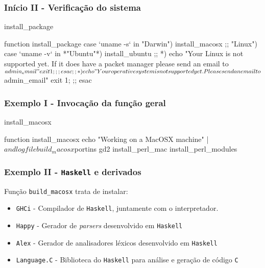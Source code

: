 \documentclass{beamer}
\begin{document}
\begin{frame}[fragile] \frametitle{Início II - Verificação do sistema}
\begin{block}{install\_package}
\begin{haskell}
function install_package {
        case `uname -s` in
                "Darwin")       install_macosx
                                ;;
                "Linux")        case `uname -v` in
                                *"Ubuntu"*)   install_ubuntu
                                              ;;
                                *)            echo "Your Linux is not supported yet. If it does have a packet manager please send an email to $admin_email"
                                              exit 1;
                                              ;;
                                esac
                        ;;
                *)		echo "Your operative system is not supported yet. Please send an email to $admin_email"
                        exit 1;
                        ;;
        esac
}
\end{haskell}
\end{block}
\end{frame}

\begin{frame}[fragile] \frametitle{Exemplo I - Invocação da função geral}
\begin{block}{install\_macosx}
\begin{haskell}
function install_macosx {
        echo "Working on a MacOSX machine" | $andlogfile
        build_macosx
        $portins gd2
        install_perl_mac
        install_perl_modules
}
\end{haskell}
\end{block}
\end{frame}

\begin{frame}[fragile] \frametitle{Exemplo II - \texttt{Haskell} e derivados}
Função \texttt{build\_macosx} trata de instalar:
\begin{itemize}
 \item \texttt{GHCi} - Compilador de \texttt{Haskell}, juntamente com o interpretador.
 \item \texttt{Happy} - Gerador de \emph{parsers} desenvolvido em \texttt{Haskell}
 \item \texttt{Alex} - Gerador de analisadores léxicos desenvolvido em \texttt{Haskell}
 \item \texttt{Language.C} - Biblioteca do \texttt{Haskell} para análise e geração de código \texttt{C}
\end{itemize}
\end{frame}
\end{document}
